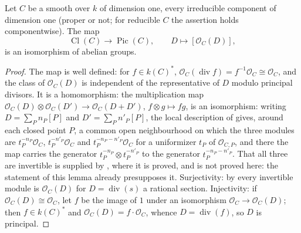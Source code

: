 \begin{lemma}
\label{lem:pcb-divisor-class-curve}
Let \(C\) be a smooth  over \(k\) of
dimension one, every irreducible component of dimension one (proper or
not; for reducible \(C\) the assertion holds componentwise).  The map
\[
 \operatorname{Cl}(C)\to\operatorname{Pic}(C),\qquad
 D\mapsto[\mathcal O_C(D)],
\]
is an isomorphism of abelian groups.
\end{lemma}
\begin{proof}
The map is well defined: for \(f\in k(C)^*\),
\(\mathcal O_C(\operatorname{div}f)=f^{-1}\mathcal O_C\cong
\mathcal O_C\), and the class of \(\mathcal O_C(D)\) is independent
of the representative of \(D\) modulo principal divisors.  It is a
homomorphism: the multiplication map
\(\mathcal O_C(D)\otimes\mathcal O_C(D')\to\mathcal O_C(D+D')\),
\(f\otimes g\mapsto fg\), is an isomorphism: writing
\(D=\sum_Pn_P[P]\) and \(D'=\sum_Pn'_P[P]\), the local description of
 gives, around each closed point \(P\), a common
open neighbourhood on which the three modules are
\(t_P^{-n_P}\mathcal O_C\), \(t_P^{-n'_P}\mathcal O_C\) and
\(t_P^{-n_P-n'_P}\mathcal O_C\) for a uniformizer \(t_P\) of
\(\mathcal O_{C,P}\), and there the map carries the generator
\(t_P^{-n_P}\otimes t_P^{-n'_P}\) to the generator
\(t_P^{-n_P-n'_P}\).  That all three are invertible is supplied by
, where it is proved, and is not proved here:
the statement of this lemma already presupposes it.
Surjectivity: by  every
invertible module is \(\mathcal O_C(D)\) for
\(D=\operatorname{div}(s)\) a rational section.  Injectivity: if
\(\mathcal O_C(D)\cong\mathcal O_C\), let \(f\) be the image of
\(1\) under an isomorphism \(\mathcal O_C\to\mathcal O_C(D)\); then
\(f\in k(C)^*\) and \(\mathcal O_C(D)=f\cdot\mathcal O_C\), whence
\(D=\operatorname{div}(f)\), so \(D\) is principal.
\end{proof}

